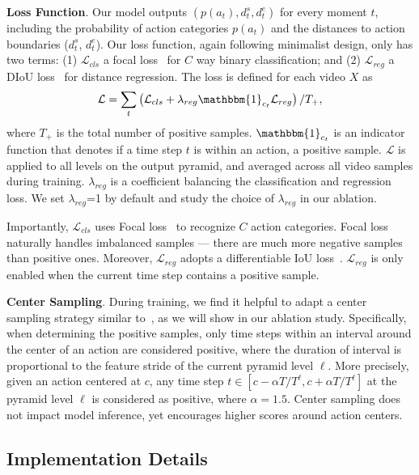 \smallskip
\noindent \textbf{Loss Function}. Our model outputs $(p(a_t), d_t^s, d_t^e)$ for every moment $t$, including the probability of action categories $p(a_{t})$ and the distances to action boundaries ($d^s_{t}$, $d^e_{t}$). Our loss function, again following minimalist design, only has two terms: (1) $\mathcal L_{cls}$ a focal loss~\cite{focaliccv2017} for $C$ way binary classification; and (2) $\mathcal L_{reg}$ a DIoU loss~\cite{diouaaai2020} for distance regression. The loss is defined for each video $X$ as
\begin{equation}
    \mathcal L = \sum_{t}\left(
    \mathcal L_{cls} + \lambda_{reg}\mathbbm{1}_{c_t}\mathcal L_{reg}\right) / {T_{+}},
\label{eq:loss}
\end{equation}
where $T_{+}$ is the total number of positive samples. $\mathbbm{1}_{c_t}$ is an indicator function that denotes if a time step $t$ is within an action, \ie a positive sample. $\mathcal L$ is applied to all levels on the output pyramid, and averaged across all video samples during training. $\lambda_{reg}$ is a coefficient balancing the classification and regression loss. We set $\lambda_{reg}$=1 by default and study the choice of $\lambda_{reg}$ in our ablation.

Importantly, $\mathcal L_{cls}$ uses Focal loss~\cite{fcosiccv2019} to recognize $C$ action categories. Focal loss naturally handles imbalanced samples --- there are much more negative samples than positive ones. Moreover, $\mathcal L_{reg}$ adopts a differentiable IoU loss~\cite{gioucvpr2019}. $\mathcal L_{reg}$ is only enabled when the current time step contains a positive sample.

\smallskip
\noindent \textbf{Center Sampling}. During training, we find it helpful to adapt a center sampling strategy similar to~\cite{fcosiccv2019,zhang2020bridging}, as we will show in our ablation study. Specifically, when determining the positive samples, only time steps within an interval around the center of an action are considered positive, where the duration of interval is proportional to the feature stride of the current pyramid level $\ell$. More precisely, given an action centered at $c$, any time step $t \in [c - \alpha T / T^{\ell},  c + \alpha T / T^{\ell}]$ at the pyramid level $\ell$ is considered as positive, where $\alpha=1.5$. Center sampling does not impact model inference, yet encourages higher scores around action centers.

\subsection{Implementation Details}\label{sec:method:implement}

